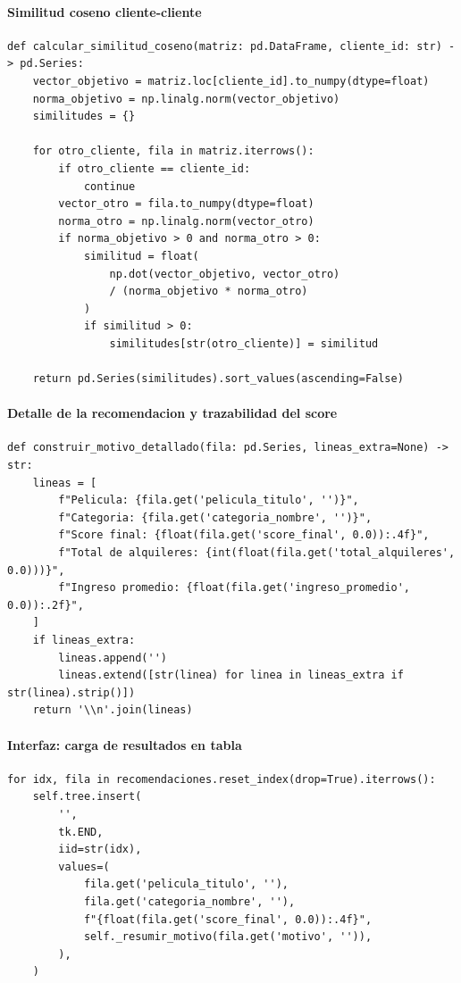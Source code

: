 ﻿\documentclass{article}
\begin{document}
\paragraph{Similitud coseno cliente-cliente}
\begin{lstlisting}
def calcular_similitud_coseno(matriz: pd.DataFrame, cliente_id: str) -> pd.Series:
    vector_objetivo = matriz.loc[cliente_id].to_numpy(dtype=float)
    norma_objetivo = np.linalg.norm(vector_objetivo)
    similitudes = {}

    for otro_cliente, fila in matriz.iterrows():
        if otro_cliente == cliente_id:
            continue
        vector_otro = fila.to_numpy(dtype=float)
        norma_otro = np.linalg.norm(vector_otro)
        if norma_objetivo > 0 and norma_otro > 0:
            similitud = float(
                np.dot(vector_objetivo, vector_otro)
                / (norma_objetivo * norma_otro)
            )
            if similitud > 0:
                similitudes[str(otro_cliente)] = similitud

    return pd.Series(similitudes).sort_values(ascending=False)
\end{lstlisting}

\paragraph{Detalle de la recomendacion y trazabilidad del score}
\begin{lstlisting}
def construir_motivo_detallado(fila: pd.Series, lineas_extra=None) -> str:
    lineas = [
        f"Pelicula: {fila.get('pelicula_titulo', '')}",
        f"Categoria: {fila.get('categoria_nombre', '')}",
        f"Score final: {float(fila.get('score_final', 0.0)):.4f}",
        f"Total de alquileres: {int(float(fila.get('total_alquileres', 0.0)))}",
        f"Ingreso promedio: {float(fila.get('ingreso_promedio', 0.0)):.2f}",
    ]
    if lineas_extra:
        lineas.append('')
        lineas.extend([str(linea) for linea in lineas_extra if str(linea).strip()])
    return '\\n'.join(lineas)
\end{lstlisting}

\paragraph{Interfaz: carga de resultados en tabla}
\begin{lstlisting}
for idx, fila in recomendaciones.reset_index(drop=True).iterrows():
    self.tree.insert(
        '',
        tk.END,
        iid=str(idx),
        values=(
            fila.get('pelicula_titulo', ''),
            fila.get('categoria_nombre', ''),
            f"{float(fila.get('score_final', 0.0)):.4f}",
            self._resumir_motivo(fila.get('motivo', '')),
        ),
    )
\end{lstlisting}
\end{document}
